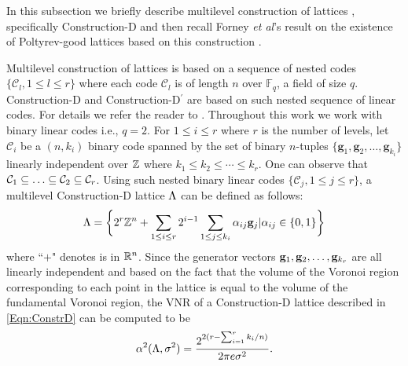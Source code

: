  In this subsection we briefly describe multilevel construction of lattices \cite{BarnesSloane83,conwaysphere}, specifically Construction-D and then recall Forney {\em et al}'s result on the existence of Poltyrev-good lattices based on this construction \cite{forney2000}.

		Multilevel construction of lattices is based on a sequence of nested codes $\{\mathcal{C}_{l},1\leq l\leq r\}$ where each code $\mathcal{C}_{l}$ is of length $n$ over $\mathbb{F}_q$, a field of size $q$. Construction-D and Construction-D$^{\prime}$ are based on such nested sequence of linear codes. For details we refer the reader to \cite{conwaysphere}. Throughout this work we work with binary linear codes i.e., $q=2$. For $1\leq i \leq r$ where $r$ is the number of levels, let $\mathcal{C}_{i}$ be a $(n,k_i)$ binary code spanned by the set of binary $n$-tuples $\{\mathbf{g}_1,\mathbf{g}_2,\ldots,\mathbf{g}_{k_i}\}$ linearly independent over $\mathbb{Z}$ where $k_{1}\leq k_{2}\leq \cdots \leq k_{r}$. One can observe that $\mathcal{C}_{1}\subseteq \ldots \subseteq \mathcal{C}_{2}\subseteq \mathcal{C}_{r}$. Using such nested binary linear codes $\{\mathcal{C}_{j},1\leq j\leq r\}$, a multilevel Construction-D lattice $\Lambda$ can be defined as follows:
\begin{align}\label{Eqn:ConstrD}
 \Lambda=\biggl\{2^{r}\mathbb{Z}^{n}+\sum_{1\leq i\leq r}2^{i-1}\sum_{1\leq j\leq k_{i}}\alpha_{ij}\mathbf{g}_j|\alpha_{ij}\in\{0,1\}\biggr\}
\end{align}
where ``$+$" denotes is in $\mathbb{R}^{n}$.  Since the generator vectors $\mathbf{g}_{1},\mathbf{g}_{2},\ldots,\mathbf{g}_{k_{r}}$ are all linearly independent and based on the fact that the volume of the Voronoi region corresponding to each point in the lattice is equal to the 	volume of the fundamental Voronoi region, the VNR of a Construction-D lattice described in \eqref{Eqn:ConstrD} can be computed to be
\begin{equation}\label{Eqn:VNRConstrutionD}
    \alpha^{2}(\Lambda,\sigma^{2})=\frac{2^{2(r-\sum_{i=1}^{r}k_{i}/n)}}{2\pi e\sigma^{2}}.
\end{equation}
